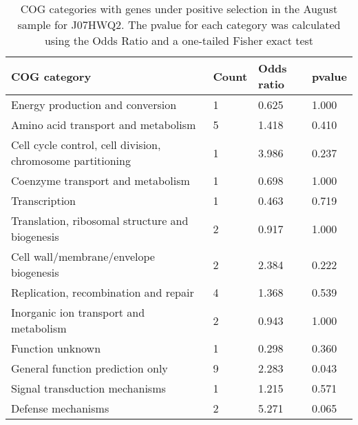 \begin{table}[hb]
\footnotesize 
	\tabcolsep=0.11cm 
\caption{COG categories with genes under positive selection in the August sample for J07HWQ2. The pvalue for each category was calculated using the Odds Ratio and a one-tailed Fisher exact test} 
\begin{tabularx}{\textwidth}{L{6cm}R{2cm}R{2cm}R{2cm}} 
\hline 
\textbf{COG category} & \textbf{Count} & \textbf{Odds ratio} & \textbf{pvalue} \\ 
\hline 
Energy production and conversion & 1 & 0.625 & 1.000 \\ 
Amino acid transport and metabolism & 5 & 1.418 & 0.410 \\ 
Cell cycle control, cell division, chromosome partitioning & 1 & 3.986 & 0.237 \\ 
Coenzyme transport and metabolism & 1 & 0.698 & 1.000 \\ 
Transcription & 1 & 0.463 & 0.719 \\ 
Translation, ribosomal structure and biogenesis & 2 & 0.917 & 1.000 \\ 
Cell wall/membrane/envelope biogenesis & 2 & 2.384 & 0.222 \\ 
Replication, recombination and repair & 4 & 1.368 & 0.539 \\ 
Inorganic ion transport and metabolism & 2 & 0.943 & 1.000 \\ 
Function unknown & 1 & 0.298 & 0.360 \\ 
General function prediction only & 9 & 2.283 & 0.043 \\ 
Signal transduction mechanisms & 1 & 1.215 & 0.571 \\ 
Defense mechanisms & 2 & 5.271 & 0.065 \\ 
\end{tabularx} 
\label{August_COG_Selection_J07HWQ2} 
 \end{table} 

